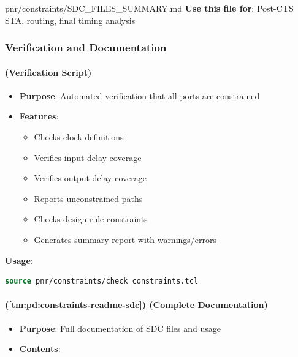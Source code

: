 \begin{relocated}{pnr/constraints/SDC_FILES_SUMMARY.md}
\textbf{Use this file for}: Post-CTS STA, routing, final timing analysis

\subsubsection{Verification and Documentation}\label{tm:pd:constraints-sdc-files-summary:2-verification-and-documentation}

\paragraph{\texorpdfstring{ (Verification
Script)}{ (Verification Script)}}\label{tm:pd:constraints-sdc-files-summary:check-constraintstcl-verification-script}

\begin{itemize}
\tightlist
\item
  \textbf{Purpose}: Automated verification that all ports are
  constrained
\item
  \textbf{Features}:

  \begin{itemize}
  \tightlist
  \item
    Checks clock definitions
  \item
    Verifies input delay coverage
  \item
    Verifies output delay coverage
  \item
    Reports unconstrained paths
  \item
    Checks design rule constraints
  \item
    Generates summary report with warnings/\allowbreak{}errors
  \end{itemize}
\end{itemize}

\textbf{Usage}:

\begin{lstlisting}[language=tcl]
source pnr/constraints/check_constraints.tcl
\end{lstlisting}

\paragraph{\texorpdfstring{ (\cref{tm:pd:constraints-readme-sdc}) (Complete
Documentation)}{ (Complete Documentation)}}\label{tm:pd:constraints-sdc-files-summary:readme-sdcmd-complete-documentation}

\begin{itemize}
\tightlist
\item
  \textbf{Purpose}: Full documentation of SDC files and usage
\item
  \textbf{Contents}:


\end{itemize}
\end{relocated}
